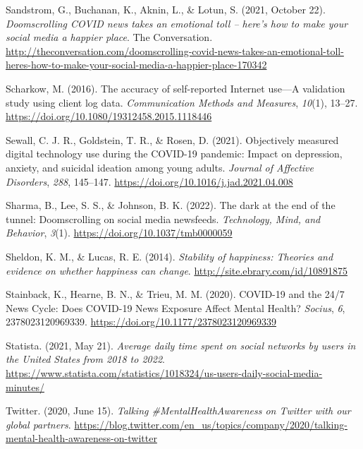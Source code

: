 \documentclass[
  man,mask,floatsintext]{apa7}
\newlength{\cslhangindent}
\newlength{\cslentryspacingunit} %
\newenvironment{CSLReferences}[2] %
 {%
  \setlength{\parindent}{0pt}
  \ifodd #1
  \let\oldpar\par
  \def\par{\hangindent=\cslhangindent\oldpar}
  \fi
  \setlength{\parskip}{#2\cslentryspacingunit}
 }%
 {}
\begin{document}
\begin{CSLReferences}{1}{0}
\leavevmode{}%
Sandstrom, G., Buchanan, K., Aknin, L., \& Lotun, S. (2021, October 22). \emph{Doomscrolling {COVID} news takes an emotional toll -- here's how to make your social media a happier place}. {The Conversation}. \url{http://theconversation.com/doomscrolling-covid-news-takes-an-emotional-toll-heres-how-to-make-your-social-media-a-happier-place-170342}

\leavevmode{}%
Scharkow, M. (2016). The accuracy of self-reported {Internet} use---{A} validation study using client log data. \emph{Communication Methods and Measures}, \emph{10}(1), 13--27. \url{https://doi.org/10.1080/19312458.2015.1118446}

\leavevmode{}%
Sewall, C. J. R., Goldstein, T. R., \& Rosen, D. (2021). Objectively measured digital technology use during the {COVID-19} pandemic: {Impact} on depression, anxiety, and suicidal ideation among young adults. \emph{Journal of Affective Disorders}, \emph{288}, 145--147. \url{https://doi.org/10.1016/j.jad.2021.04.008}

\leavevmode{}%
Sharma, B., Lee, S. S., \& Johnson, B. K. (2022). The dark at the end of the tunnel: {Doomscrolling} on social media newsfeeds. \emph{Technology, Mind, and Behavior}, \emph{3}(1). \url{https://doi.org/10.1037/tmb0000059}

\leavevmode{}%
Sheldon, K. M., \& Lucas, R. E. (2014). \emph{Stability of happiness: Theories and evidence on whether happiness can change}. \url{http://site.ebrary.com/id/10891875}

\leavevmode{}%
Stainback, K., Hearne, B. N., \& Trieu, M. M. (2020). {COVID-19} and the 24/7 {News Cycle}: {Does COVID-19 News Exposure Affect Mental Health}? \emph{Socius}, \emph{6}, 2378023120969339. \url{https://doi.org/10.1177/2378023120969339}

\leavevmode{}%
Statista. (2021, May 21). \emph{Average daily time spent on social networks by users in the {United States} from 2018 to 2022}. \url{https://www.statista.com/statistics/1018324/us-users-daily-social-media-minutes/}

\leavevmode{}%
Twitter. (2020, June 15). \emph{Talking \#{MentalHealthAwareness} on {Twitter} with our global partners}. \url{https://blog.twitter.com/en_us/topics/company/2020/talking-mental-health-awareness-on-twitter}


\end{CSLReferences}
\end{document}
